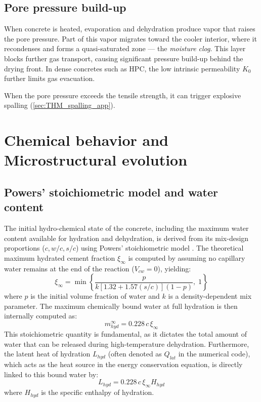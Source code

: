 \subsection{Pore pressure build-up} \label{sec:pore_pressure}

When concrete is heated, evaporation and dehydration produce vapor that raises the pore pressure. Part of this vapor migrates toward the cooler interior, where it recondenses and forms a quasi-saturated zone --- the \textit{moisture clog}. This layer blocks further gas transport, causing significant pressure build-up behind the drying front. In dense concretes such as HPC, the low intrinsic permeability $K_0$ further limits gas evacuation.

When the pore pressure exceeds the tensile strength, it can trigger explosive spalling (\cref{sec:THM_spalling_app}).

\section{Chemical behavior and Microstructural evolution} \label{sec:chemical_microstructure}

\subsection{Powers' stoichiometric model and water content} \label{sec:powers}
The initial hydro-chemical state of the concrete, including the maximum water content available for hydration and dehydration, is derived from its mix-design proportions ($c, w/c, s/c$) using Powers' stoichiometric model \cite{sciume2024}.
The theoretical maximum hydrated cement fraction $\xi_\infty$ is computed by assuming no capillary water remains at the end of the reaction ($V_{cw} = 0$), yielding:
\begin{equation}
    \xi_\infty = \min \left\{ \frac{p}{k[1.32 + 1.57(s/c)](1-p)},\; 1 \right\}
\end{equation}
where $p$ is the initial volume fraction of water and $k$ is a density-dependent mix parameter. 
The maximum chemically bound water at full hydration is then internally computed as:
\begin{equation}
    m_{hyd}^\infty = 0.228\, c\, \xi_\infty
\end{equation}
This stoichiometric quantity is fundamental, as it dictates the total amount of water that can be released during high-temperature dehydration. Furthermore, the latent heat of hydration $L_{hyd}$ (often denoted as $Q_{lat}$ in the numerical code), which acts as the heat source in the energy conservation equation, is directly linked to this bound water by:
\begin{equation}
    L_{hyd} = 0.228\, c\, \xi_\infty H_{hyd}
\end{equation}
where $H_{hyd}$ is the specific enthalpy of hydration.

